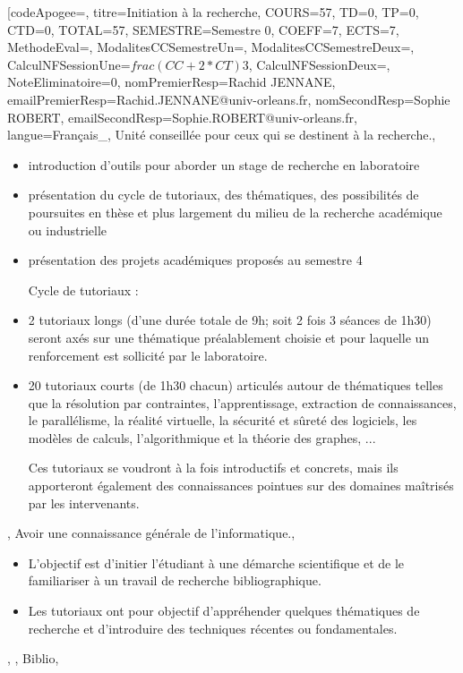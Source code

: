 \module[codeApogee={},
titre={Initiation à la recherche},
COURS={57},
TD={0},
TP={0},
CTD={0},
TOTAL={57},
SEMESTRE={Semestre 0},
COEFF={7},
ECTS={7},
MethodeEval={},
ModalitesCCSemestreUn={},
ModalitesCCSemestreDeux={},
CalculNFSessionUne={$frac{(CC+2*CT)}{3}$},
CalculNFSessionDeux={},
NoteEliminatoire={0},
nomPremierResp={Rachid JENNANE},
emailPremierResp={Rachid.JENNANE@univ-orleans.fr},
nomSecondResp={Sophie ROBERT},
emailSecondResp={Sophie.ROBERT@univ-orleans.fr},
langue={Français_},
{Unité conseillée pour ceux qui se destinent à la recherche.},
{\begin{itemize}
Initiation au stage recherche :

\item introduction d'outils pour aborder un stage de recherche en laboratoire
\item présentation du cycle de tutoriaux, des thématiques, des possibilités de poursuites en thèse et plus largement du milieu de la recherche académique ou industrielle
\item présentation des projets académiques proposés au semestre 4
 
Cycle de tutoriaux :

\item 2 tutoriaux longs (d'une durée totale de 9h; soit 2 fois 3 séances de 1h30) seront axés sur une thématique préalablement
choisie et pour laquelle un renforcement est sollicité par le laboratoire.
\item 20 tutoriaux courts (de 1h30 chacun) articulés autour de thématiques telles que la résolution par contraintes,
l'apprentissage, extraction de connaissances, le parallélisme, la réalité virtuelle, la sécurité et sûreté des logiciels,
les modèles de calculs, l'algorithmique et la théorie des graphes, ...
 
Ces tutoriaux se voudront à la fois introductifs et concrets, mais ils apporteront également des connaissances pointues sur des domaines maîtrisés par les intervenants.
\end{itemize}},
{Avoir une connaissance générale de l'informatique.},
{\begin{itemize}
\item L'objectif est d'initier l'étudiant à une démarche scientifique et de le familiariser à un travail de recherche bibliographique. 
\item Les tutoriaux ont pour objectif d'appréhender quelques thématiques de recherche et d'introduire des techniques récentes ou fondamentales.
\end{itemize}},
{},
{Biblio},

